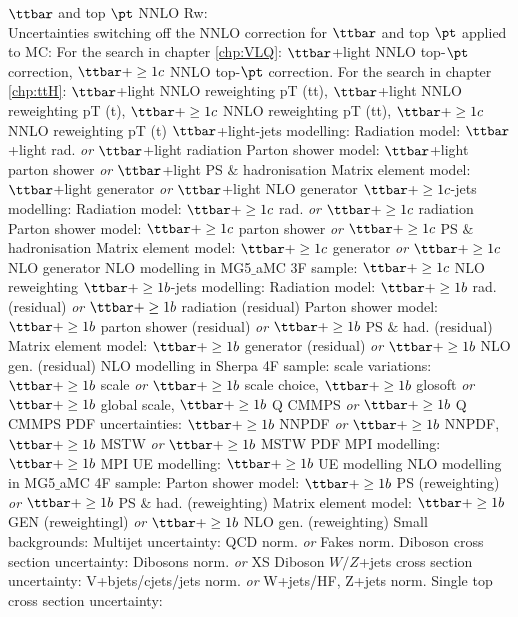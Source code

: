\ib $\ttbar$ and top $\pt$ NNLO Rw:\\ Uncertainties switching off the NNLO correction for $\ttbar$ and top $\pt$ applied to MC:
\bi
\ib For the search in chapter \ref{chp:VLQ}: $\ttbar$+light NNLO top-$\pt$ correction, $\ttbar+\ge1c$ NNLO top-$\pt$ correction.
\ib For the search in chapter \ref{chp:ttH}: $\ttbar$+light NNLO reweighting pT (tt), $\ttbar$+light NNLO reweighting pT (t), $\ttbar+\ge1c$ NNLO reweighting pT (tt), $\ttbar+\ge1c$ NNLO reweighting pT (t)
\ei 
\ib $\ttbar$+light-jets modelling:
\bi
\ib Radiation model: $\ttbar$+light rad. \emph{or} $\ttbar$+light radiation
\ib Parton shower model: $\ttbar$+light parton shower \emph{or} $\ttbar$+light PS $\&$ hadronisation
\ib Matrix element model: $\ttbar$+light generator \emph{or} $\ttbar$+light NLO generator
\ei
\ib $\ttbar+\ge1c$-jets modelling:
\bi
\ib Radiation model: $\ttbar+\ge1c$ rad. \emph{or} $\ttbar+\ge1c$ radiation
\ib Parton shower model: $\ttbar+\ge1c$ parton shower \emph{or} $\ttbar+\ge1c$ PS $\&$ hadronisation
\ib Matrix element model: $\ttbar+\ge1c$ generator \emph{or} $\ttbar+\ge1c$ NLO generator
\ib NLO modelling in {\sc MG5$\_$aMC} 3F sample: $\ttbar+\ge1c$ NLO reweighting
\ei
\ib $\ttbar+\ge1b$-jets modelling:
\bi
\ib Radiation model: $\ttbar+\ge1b$ rad. (residual) \emph{or} $\ttbar+\ge1b$ radiation (residual)
\ib Parton shower model: $\ttbar+\ge1b$ parton shower (residual) \emph{or} $\ttbar+\ge1b$ PS $\&$ had. (residual)
\ib Matrix element model: $\ttbar+\ge1b$ generator (residual) \emph{or} $\ttbar+\ge1b$ NLO gen. (residual)
\ib NLO modelling in {\sc Sherpa} 4F sample:
\bi
\ib scale variations: $\ttbar+\ge1b$ scale  \emph{or} $\ttbar+\ge1b$ scale choice, $\ttbar+\ge1b$ glosoft  \emph{or} $\ttbar+\ge1b$ global scale, $\ttbar+\ge1b$ Q CMMPS \emph{or} $\ttbar+\ge1b$ Q CMMPS
\ib PDF uncertainties: $\ttbar+\ge1b$ NNPDF  \emph{or} $\ttbar+\ge1b$ NNPDF, $\ttbar+\ge1b$ MSTW \emph{or} $\ttbar+\ge1b$ MSTW PDF
\ib MPI modelling: $\ttbar+\ge1b$ MPI
\ib UE modelling: $\ttbar+\ge1b$ UE modelling
\ei
\ib NLO modelling in {\sc MG5$\_$aMC} 4F sample:
\bi
\ib Parton shower model: $\ttbar+\ge1b$ PS (reweighting) \emph{or} $\ttbar+\ge1b$ PS $\&$ had. (reweighting)
\ib Matrix element model: $\ttbar+\ge1b$ GEN (reweightingl) \emph{or} $\ttbar+\ge1b$ NLO gen. (reweighting)
\ei
\ei
\ib Small backgrounds:
\bi
\ib Multijet uncertainty: QCD norm. \emph{or} Fakes norm.
\ib Diboson cross section uncertainty: Dibosons norm. \emph{or} XS Diboson
\ib $W/Z$+jets cross section uncertainty: V+bjets/cjets/jets norm. \emph{or} W+jets/HF, Z+jets norm.
\ib Single top cross section uncertainty:
